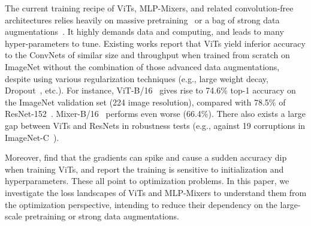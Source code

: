 \documentclass{article}
\begin{document}
The current training recipe of ViTs, MLP-Mixers, and related convolution-free architectures relies heavily on massive pretraining~\cite{dosovitskiy2021an,arnab2021vivit,akbari2021vatt} or a bag of strong data augmentations~\cite{touvron2021training,tolstikhin2021mlpmixer,cubuk2019autoaugment, cubuk2019randaugment, zhang2018mixup, yun2019cutmix}. It highly demands data and computing, and leads to many hyper-parameters to tune. Existing works report that ViTs yield inferior accuracy to the ConvNets of similar size and throughput when trained from scratch on ImageNet without the combination of those advanced data augmentations, despite using various regularization techniques (e.g., large weight decay, Dropout~\cite{srivastava14dropout}, etc.).
For instance,  ViT-B/16~\cite{dosovitskiy2021an} gives rise to 74.6\% top-1 accuracy on the ImageNet validation set (224 image resolution),  compared with 78.5\% of ResNet-152~\cite{he2016resnet}. Mixer-B/16~\cite{tolstikhin2021mlpmixer} performs even worse (66.4\%).
There also exists a large gap between ViTs and ResNets in robustness tests (e.g., against 19 corruptions in ImageNet-C~\cite{hendrycks2019benchmarking}).

Moreover, \citet{chen2021empirical} find that the gradients can spike and cause a sudden accuracy dip when training ViTs, and \citet{touvron2021training} report the training is sensitive to initialization and hyperparameters. These all point to optimization problems. In this paper, we investigate the loss landscapes of ViTs and MLP-Mixers to understand them from the optimization perspective, intending to reduce their dependency on the large-scale pretraining or strong data augmentations. 


\end{document}
